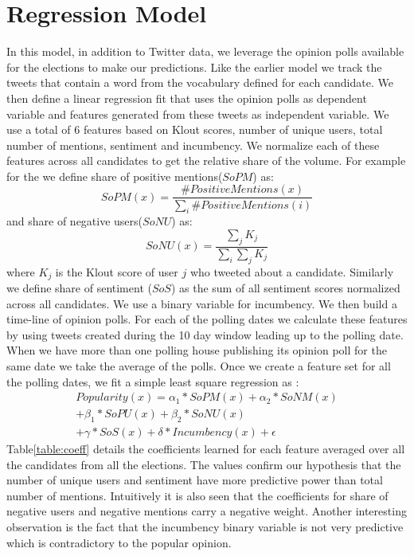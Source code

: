 \section{Regression Model}
In this model, in addition to Twitter data, we leverage the opinion polls available for the elections to make our predictions.
Like the earlier model we track the tweets that contain a word from the vocabulary defined for each candidate.
We then define a linear regression fit that uses the opinion polls as dependent variable and features generated from these tweets as independent variable.
We use a total of 6 features based on Klout scores, number of unique users, total number of mentions, sentiment and incumbency.
We normalize each of these features across all candidates to get the relative share of the volume. 
For example for the we define share of positive mentions($SoPM$)  as: 
\begin{equation}
SoPM(x) = \frac{\#PositiveMentions(x)}{\sum_i \#PositiveMentions(i)} 
\end{equation}
and share of negative users($SoNU$) as:
\begin{equation}
SoNU(x) = \frac{\sum_j K_j}{\sum_i \sum_j K_j}
\end{equation}
where $K_j$ is the Klout score of user $j$ who tweeted about a candidate.
Similarly we define share of sentiment ($SoS$) as the sum of all sentiment scores normalized across all candidates. 
We use a binary variable for incumbency. 
We then build a time-line of opinion polls. 
For each of the polling dates we calculate these features by using tweets created during the 10 day window leading up to the polling date.
When we have more than one polling house publishing its opinion poll for the same date we take the average of the polls. 
Once we create a feature set for all the polling dates, we fit a simple least square regression as :
\begin{equation}
\begin{split}
Popularity(x) = \alpha_1 * SoPM(x) + \alpha_2 * SoNM(x) \\
						 + \beta_1 * SoPU(x) + \beta_2 * SoNU(x) \\
						 + \gamma * SoS(x) + \delta * Incumbency(x) + \epsilon
\end{split}
\end{equation}
Table\ref{table:coeff} details the coefficients learned for each feature averaged over all the candidates from all the elections.
The values confirm our hypothesis that the number of unique users and sentiment have more predictive power than total number of mentions.
Intuitively it is also seen that the coefficients for share of negative users and negative mentions carry a negative weight.
Another interesting observation is the fact that the incumbency binary variable is not very predictive which is contradictory to the popular opinion.

